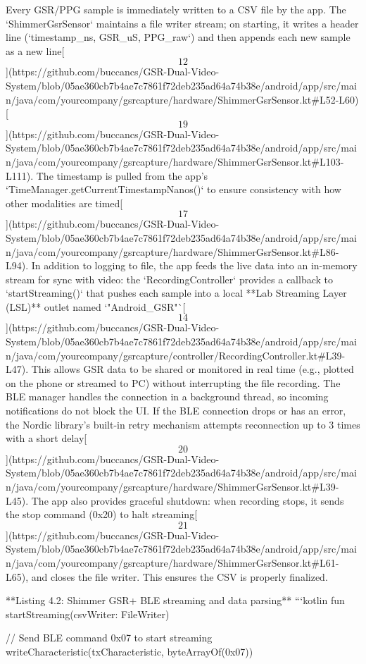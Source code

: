 \documentclass[12pt,a4paper]{article}
\begin{document}
{Every GSR/PPG sample is immediately written to a CSV file by the app.
The `ShimmerGsrSensor` maintains a file writer stream; on starting, it
writes a header line (`timestamp_ns, GSR_uS, PPG_raw`) and then appends
each new sample as a new
line[\[12\]](https://github.com/buccancs/GSR-Dual-Video-System/blob/05ae360cb7b4ae7c7861f72deb235ad64a74b38e/android/app/src/main/java/com/yourcompany/gsrcapture/hardware/ShimmerGsrSensor.kt#L52-L60)[\[19\]](https://github.com/buccancs/GSR-Dual-Video-System/blob/05ae360cb7b4ae7c7861f72deb235ad64a74b38e/android/app/src/main/java/com/yourcompany/gsrcapture/hardware/ShimmerGsrSensor.kt#L103-L111).
The timestamp is pulled from the app's
`TimeManager.getCurrentTimestampNanos()` to ensure consistency with how
other modalities are
timed[\[17\]](https://github.com/buccancs/GSR-Dual-Video-System/blob/05ae360cb7b4ae7c7861f72deb235ad64a74b38e/android/app/src/main/java/com/yourcompany/gsrcapture/hardware/ShimmerGsrSensor.kt#L86-L94).
In addition to logging to file, the app feeds the live data into an
in-memory stream for sync with video: the `RecordingController` provides
a callback to `startStreaming()` that pushes each sample into a local
**Lab Streaming Layer (LSL)** outlet named
`"Android_GSR"`[\[14\]](https://github.com/buccancs/GSR-Dual-Video-System/blob/05ae360cb7b4ae7c7861f72deb235ad64a74b38e/android/app/src/main/java/com/yourcompany/gsrcapture/controller/RecordingController.kt#L39-L47).
This allows GSR data to be shared or monitored in real time (e.g.,
plotted on the phone or streamed to PC) without interrupting the file
recording. The BLE manager handles the connection in a background
thread, so incoming notifications do not block the UI. If the BLE
connection drops or has an error, the Nordic library's built-in retry
mechanism attempts reconnection up to 3 times with a short
delay[\[20\]](https://github.com/buccancs/GSR-Dual-Video-System/blob/05ae360cb7b4ae7c7861f72deb235ad64a74b38e/android/app/src/main/java/com/yourcompany/gsrcapture/hardware/ShimmerGsrSensor.kt#L39-L45).
The app also provides graceful shutdown: when recording stops, it sends
the stop command (0x20) to halt
streaming[\[21\]](https://github.com/buccancs/GSR-Dual-Video-System/blob/05ae360cb7b4ae7c7861f72deb235ad64a74b38e/android/app/src/main/java/com/yourcompany/gsrcapture/hardware/ShimmerGsrSensor.kt#L61-L65),
and closes the file writer. This ensures the CSV is properly finalized.

**Listing 4.2: Shimmer GSR+ BLE streaming and data parsing**
```kotlin
fun startStreaming(csvWriter: FileWriter) {
    // Send BLE command 0x07 to start streaming
    writeCharacteristic(txCharacteristic, byteArrayOf(0x07))
    
}}
\end{document}
